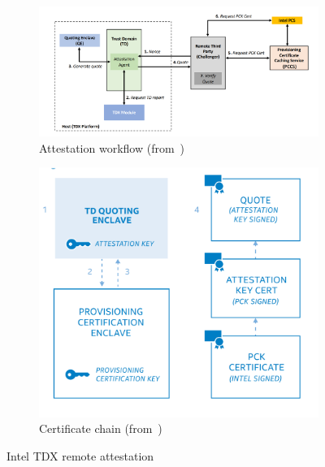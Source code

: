 \begin{figure}[htp]
  \centering
  \begin{subfigure}[b]{0.65\textwidth}
      \centering
      \includegraphics[width=\textwidth]{images/tdx_attestation_flow.png}
      \caption{Attestation workflow (from~\cite*{DBLP:journals/corr/abs-2303-15540})}
      \label{fig:tdx_attestation_flow}
  \end{subfigure}
  \hfill
  \begin{subfigure}[b]{0.3\textwidth}
      \centering
      \includegraphics[width=\textwidth]{images/tdx_certi_chain.png}
      \caption{Certificate chain (from~\cite*{Intel_tdx_whitepaper})}
      \label{fig:tdx_certi_chain}
  \end{subfigure}
  \hfill
     \caption[Intel TDX remote attestation]{Intel TDX remote attestation}
     \label{fig:tdx_attestation}
\end{figure}

